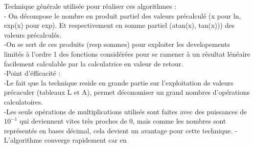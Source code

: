 \documentclass{article}
\begin{document}
Technique générale utilisée pour réaliser ces algorithmes :\\
- On décompose le nombre en produit partiel des valeurs précalculé (x pour ln, exp(x) pour exp). Et respectivement en somme partiel (atan(x), tan(x))) des valeurs précalculés.\\
-On se sert de ces produits (resp sommes) pour exploiter les developements  limités à l'ordre 1 des fonctions considérées pour se ramener à un résultat lénéaire facilement calculable par la calculatrice en valeur de retour. \\ 
-Point d'éfficacité : \\
-Le fait que la technique reside en grande partie sur l'exploitation de valeurs précaculer (tableaux L et A), permet déconomiser un grand nombres d'opérations calculatoires.\\
-Les seuls opérations de multiplications utilisés sont faites avec des puissances de $10^{-1}$ qui deviennent vites très proches de 0, mais comme les nombres sont représentés en bases décimal, cela devient un avantage pour cette technique.
-L'algorithme converge rapidement car en 
\end{document}
